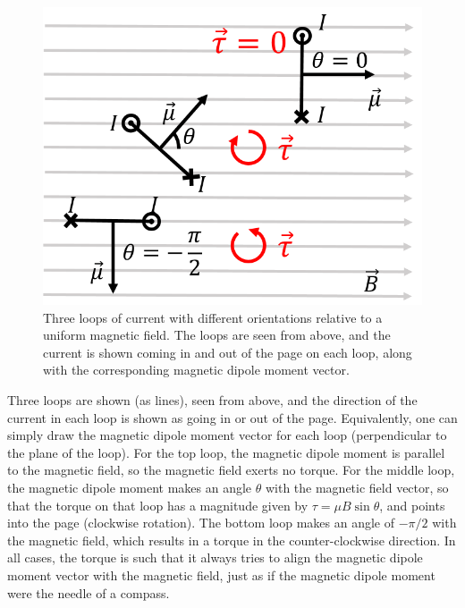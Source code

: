 \begin{figure}[!htbp]
\centering
\includegraphics[width=0.4\linewidth]{files/looptorque-b927579e38704625c1187c37c60b60b6.png}
\caption[]{Three loops of current with different orientations relative to a uniform magnetic field. The loops are seen from above, and the current is shown coming in and out of the page on each loop, along with the corresponding magnetic dipole moment vector.}
\label{fig:magneticforce:looptorque}
\end{figure}

Three loops are shown (as lines), seen from above, and the direction of the current in each loop is shown as going in or out of the page. Equivalently, one can simply draw the magnetic dipole moment vector for each loop (perpendicular to the plane of the loop). For the top loop, the magnetic dipole moment is parallel to the magnetic field, so the magnetic field exerts no torque. For the middle loop, the magnetic dipole moment makes an angle $\theta$ with the magnetic field vector, so that the torque on that loop has a magnitude given by $\tau=\mu B \sin\theta$, and points into the page (clockwise rotation). The bottom loop makes an angle of $-\pi/2$ with the magnetic field, which results in a torque in the counter-clockwise direction. In all cases, the torque is such that it always tries to align the magnetic dipole moment vector with the magnetic field, just as if the magnetic dipole moment were the needle of a compass.

